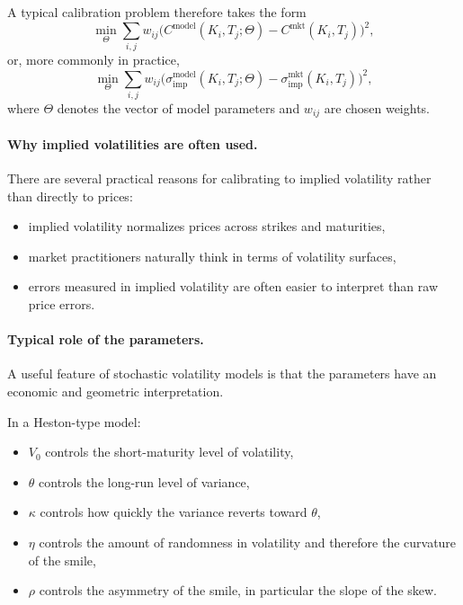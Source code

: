 \documentclass[11pt]{article}
\theoremstyle{plain}
\theoremstyle{definition}
\theoremstyle{remark}
\begin{document}
A typical calibration problem therefore takes the form
\[
\min_{\Theta}
\sum_{i,j}
w_{ij}
\Big(
C^{\mathrm{model}}(K_i,T_j;\Theta)
-
C^{\mathrm{mkt}}(K_i,T_j)
\Big)^2,
\]
or, more commonly in practice,
\[
\min_{\Theta}
\sum_{i,j}
w_{ij}
\Big(
\sigma_{\mathrm{imp}}^{\mathrm{model}}(K_i,T_j;\Theta)
-
\sigma_{\mathrm{imp}}^{\mathrm{mkt}}(K_i,T_j)
\Big)^2,
\]
where \(\Theta\) denotes the vector of model parameters and
\(w_{ij}\) are chosen weights.

\paragraph{Why implied volatilities are often used.}

There are several practical reasons for calibrating to implied
volatility rather than directly to prices:
\begin{itemize}[leftmargin=1.4em]
    \item implied volatility normalizes prices across strikes and maturities,
    \item market practitioners naturally think in terms of volatility
    surfaces,
    \item errors measured in implied volatility are often easier to
    interpret than raw price errors.
\end{itemize}

\paragraph{Typical role of the parameters.}

A useful feature of stochastic volatility models is that the parameters
have an economic and geometric interpretation.

In a Heston-type model:
\begin{itemize}[leftmargin=1.4em]
    \item \(V_0\) controls the short-maturity level of volatility,
    \item \(\theta\) controls the long-run level of variance,
    \item \(\kappa\) controls how quickly the variance reverts toward
    \(\theta\),
    \item \(\eta\) controls the amount of randomness in volatility and
    therefore the curvature of the smile,
    \item \(\rho\) controls the asymmetry of the smile, in particular the
    slope of the skew.
\end{itemize}
\end{document}
